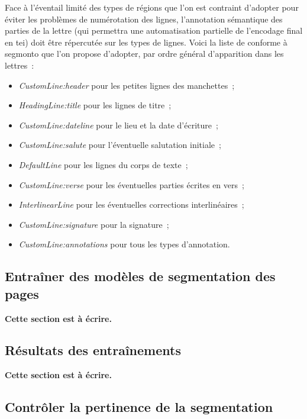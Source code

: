 \documentclass[a4paper,12pt,twoside]{book}
\begin{document}
				Face à l'éventail limité des types de régions que l'on est contraint d'adopter pour éviter les problèmes de numérotation des lignes, l'annotation sémantique des parties de la lettre (qui permettra une automatisation partielle de l'encodage final en \gls{tei}) doit être répercutée sur les types de lignes. Voici la liste de conforme à \gls{segmonto} que l'on propose d'adopter, par ordre général d'apparition dans les lettres~:
				
				\begin{itemize}
					\item \textit{CustomLine:header} pour les petites lignes des manchettes~;
					\item \textit{HeadingLine:title} pour les lignes de titre~;
					\item \textit{CustomLine:dateline} pour le lieu et la date d'écriture~;
					\item \textit{CustomLine:salute} pour l'éventuelle salutation initiale~;
					\item \textit{DefaultLine} pour les lignes du corps de texte~;
					\item \textit{CustomLine:verse} pour les éventuelles parties écrites en vers~;
					\item \textit{InterlinearLine} pour les éventuelles corrections interlinéaires~;\label{interlinear}
					\item \textit{CustomLine:signature} pour la signature~;
					\item \textit{CustomLine:annotations} pour tous les types d'annotation.
				\end{itemize}
		
			\subsection{Entraîner des modèles de segmentation des pages}
	    		\textbf{Cette section est à écrire.}
    		
    		\subsection{Résultats des entraînements}
    			\textbf{Cette section est à écrire.}
	    		
	    	\subsection{Contrôler la pertinence de la \gls{segmentation}}
		    	\label{controle-segmentation-lettres-inventoriees}
	    		
\end{document}
